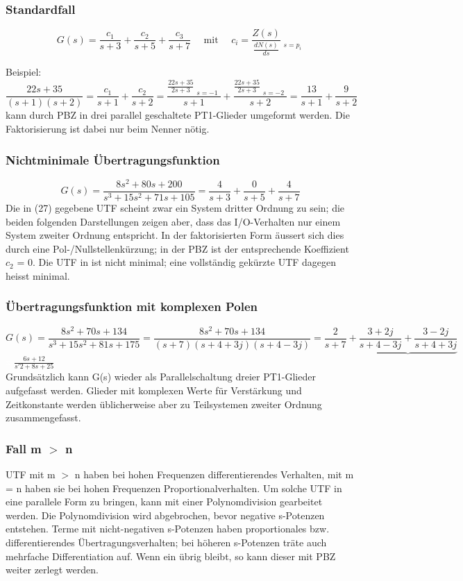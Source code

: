 \subsubsection{Standardfall}

\[ G(s) =\frac{c_{1}}{s+3} + \frac{c_{2}}{s+5} + \frac{c_{3}}{s+7} \quad \text{ mit } \quad {c_{i}= \frac{Z(s)}{\frac{dN(s)}{ds}}\mathop{\Bigg|}\limits_{s=p_{i}}}\]

Beispiel: \[\frac{22s +35}{(s+1)(s+2)}=\frac{c_{1}}{s+1}+\frac{c_{2}}{s+2}=\frac{\frac{22s+35}{2s+3}\mathop{\Big|}\limits_{s=-1}}{s+1}+\frac{\frac{22s+35}{2s+3}\mathop{\Big|}\limits_{s=-2}}{s+2}=\frac{13}{s+1}+\frac{9}{s+2}\]
kann durch PBZ in drei parallel geschaltete PT1-Glieder umgeformt werden. Die
Faktorisierung ist dabei nur beim Nenner nötig.

\subsubsection{Nichtminimale Übertragungsfunktion}
\[G(s) =\frac{8s^{2} + 80s + 200}{s^3 + 15s^2 + 71s + 105}= \frac{4}{s+3} + \frac{0}{s+5} + \frac{4}{s+7}\]
Die in (27) gegebene UTF scheint zwar ein System dritter Ordnung zu sein; die beiden
folgenden Darstellungen zeigen aber, dass das I/O-Verhalten nur einem System
zweiter Ordnung entspricht. In der faktorisierten Form äussert sich dies durch
eine Pol-/Nullstellenkürzung; in der PBZ ist der entsprechende Koeffizient $c_{2}$ = 0.
Die UTF in ist nicht minimal; eine vollständig gekürzte UTF dagegen heisst
minimal.

\subsubsection{Übertragungsfunktion mit komplexen Polen}
\[G(s) =\frac{8s^{2} + 70s + 134}{s^3 + 15s^2 + 81s + 175}= \frac{8s^2+70s+134}{(s+7)(s+4+3j)(s+4-3j)}=\frac{2}{s+7}+\underbrace{\frac{3+2j}{s+4-3j}+\frac{3-2j}{s+4+3j}}\]
\textcolor{white}{x} \hspace{14.5cm} $\frac{6s+12}{s'2+8s+25}$\\

Grundsätzlich kann G(s) wieder als Parallelschaltung dreier PT1-Glieder aufgefasst
werden. Glieder mit komplexen Werte für Verstärkung und Zeitkonstante werden
üblicherweise aber zu Teilsystemen zweiter Ordnung zusammengefasst.

\subsubsection{Fall m $>$ n}
UTF mit m $>$ n haben bei hohen Frequenzen differentierendes Verhalten, mit m = n
haben sie bei hohen Frequenzen Proportionalverhalten. Um solche UTF in eine
parallele Form zu bringen, kann mit einer Polynomdivision gearbeitet werden. Die Polynomdivision wird abgebrochen, bevor negative s-Potenzen entstehen. Terme mit nicht-negativen s-Potenzen haben proportionales
bzw. differentierendes Übertragungsverhalten; bei höheren s-Potenzen träte auch
mehrfache Differentiation auf. Wenn ein übrig bleibt, so kann dieser mit PBZ weiter zerlegt werden.

